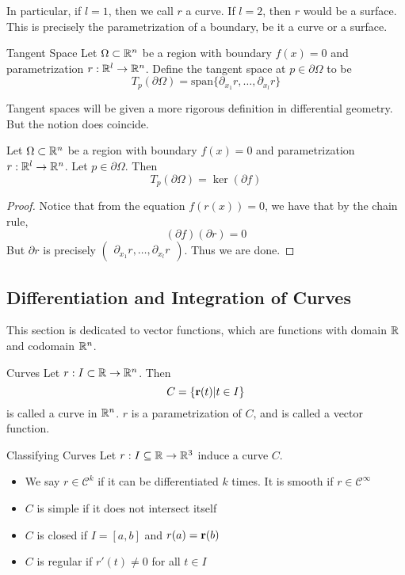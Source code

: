 \documentclass[a4paper]{article}
\begin{document}
In particular, if $l=1$, then we call $r$ a curve. If $l=2$, then $r$ would be a surface. This is precisely the parametrization of a boundary, be it a curve or a surface. 

\begin{defn}{Tangent Space}{} Let $\Omega\subset\mathbb{R}^n$ be a region with boundary $f(x)=0$ and parametrization $r:\mathbb{R}^l\to\mathbb{R}^n$. Define the tangent space at $p\in\partial\Omega$ to be $$T_p(\partial\Omega)=\text{span}\{\partial_{x_1}r,\dots,\partial_{x_l}r\}$$
\end{defn}

Tangent spaces will be given a more rigorous definition in differential geometry. But the notion does coincide. 

\begin{prp}{}{} Let $\Omega\subset\mathbb{R}^n$ be a region with boundary $f(x)=0$ and parametrization $r:\mathbb{R}^l\to\mathbb{R}^n$. Let $p\in\partial\Omega$. Then $$T_p(\partial\Omega)=\ker(\partial f)$$ \tcbline
\begin{proof}
Notice that from the equation $f(r(x))=0$, we have that by the chain rule, $$(\partial f)(\partial r)=0$$ But $\partial r$ is precisely $\begin{pmatrix}\partial_{x_1}r,\dots,\partial_{x_l}r\end{pmatrix}$. Thus we are done. 
\end{proof}
\end{prp}

\subsection{Differentiation and Integration of Curves}
This section is dedicated to vector functions, which are functions with domain $\mathbb{R}$ and codomain $\mathbb{R}^n$. 

\begin{defn}{Curves}{} Let $r:I\subset\mathbb{R}\to\mathbb{R}^n$. Then $$C=\{\vb{r}(t)|t\in I\}$$ is called a curve in $\mathbb{R}^n$. $r$ is a parametrization of $C$, and is called a vector function. 
\end{defn}

\begin{defn}{Classifying Curves}{} Let $r:I\subseteq\mathbb{R}\to\mathbb{R}^3$ induce a curve $C$. 
\begin{itemize}
\item We say $r\in\mathcal{C}^k$ if it can be differentiated $k$ times. It is smooth if $r\in\mathcal{C}^\infty$
\item $C$ is simple if it does not intersect itself
\item $C$ is closed if $I=[a,b]$ and $r(a)=\vb{r}(b)$
\item $C$ is regular if $r'(t)\neq0$ for all $t\in I$
\end{itemize}
\end{defn}
\end{document}
